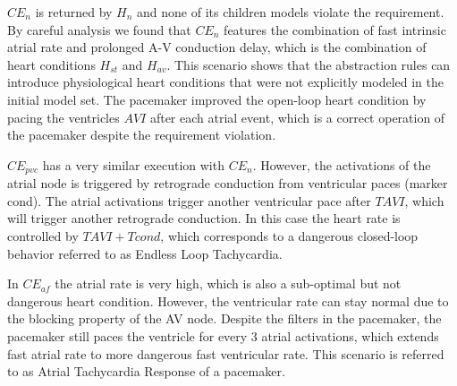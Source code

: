 $CE_{n}$ is returned by $H_n$ and none of its children models violate the requirement. By careful analysis we found that $CE_{n}$ features the combination of fast intrinsic atrial rate and prolonged A-V conduction delay, which is the combination of heart conditions $H_{st}$ and $H_{av}$. This scenario shows that the abstraction rules can introduce physiological heart conditions that were not explicitly modeled in the initial model set. The pacemaker improved the open-loop heart condition by pacing the ventricles $AVI$ after each atrial event, which is a correct operation of the pacemaker despite the requirement violation. %

$CE_{pvc}$ has a very similar execution with $CE_{n}$. However, the activations of the atrial node is triggered by retrograde conduction from ventricular paces (marker \textsf{cond}). The atrial activations trigger another ventricular pace after $TAVI$, which will trigger another retrograde conduction. In this case the heart rate is controlled by $TAVI+Tcond$, which corresponds to a dangerous closed-loop behavior referred to as Endless Loop Tachycardia.

In $CE_{af}$ the atrial rate is very high, which is also a sub-optimal but not dangerous heart condition. 
However, the ventricular rate can stay normal due to the blocking property of the AV node. 
Despite the filters in the pacemaker, the pacemaker still paces the ventricle for every 3 atrial activations, which extends fast atrial rate to more dangerous fast ventricular rate. 
This scenario is referred to as Atrial Tachycardia Response of a pacemaker. 

